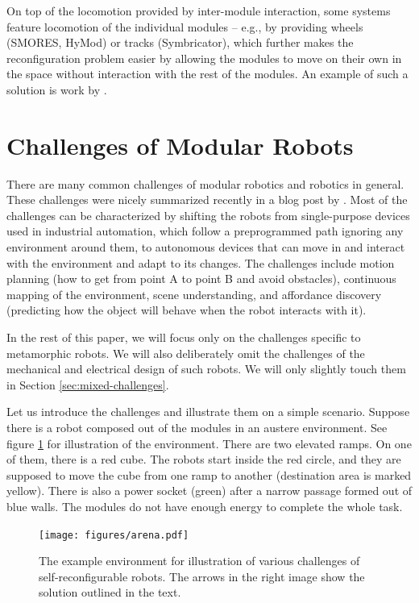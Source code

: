 On top of the locomotion provided by inter-module interaction, some systems
feature locomotion of the individual modules -- e.g., by providing wheels
(SMORES, HyMod) or tracks (Symbricator), which further makes the reconfiguration
problem easier by allowing the modules to move on their own in the space without
interaction with the rest of the modules. An example of such a solution is
work by \textcite{DBLP:journals/ral/LiuWY19}.

\section{Challenges of Modular Robots}

There are many common challenges of modular robotics and robotics in general.
These challenges were nicely summarized recently in a blog post by
\textcite{locklin_2020}. Most of the challenges can be characterized by shifting
the robots from single-purpose devices used in industrial automation, which
follow a preprogrammed path ignoring any environment around them, to autonomous
devices that can move in and interact with the environment and adapt to its
changes. The challenges include motion planning (how to get from
point A to point B and avoid obstacles), continuous mapping of the environment,
scene understanding, and affordance discovery (predicting how the object will
behave when the robot interacts with it).

In the rest of this paper, we will focus only on the challenges specific to
metamorphic robots. We will also deliberately omit the challenges of the
mechanical and electrical design of such robots. We will only slightly touch
them in Section \ref{sec:mixed-challenges}.

Let us introduce the challenges and illustrate them on a simple scenario.
Suppose there is a robot composed out of the modules in an austere environment.
See figure \ref{fig:arena} for illustration of the environment. There are two
elevated ramps. On one of them, there is a red cube. The robots start inside the
red circle, and they are supposed to move the cube from one ramp to another
(destination area is marked yellow). There is also a power socket (green) after
a narrow passage formed out of blue walls. The modules do not have enough energy
to complete the whole task.

\begin{figure}[!t]
    \centering
    \texttt{[image: figures/arena.pdf]}
    \caption{The example environment for illustration of various challenges of
    self-reconfigurable robots. The arrows in the right image show the
    solution outlined in the text.}
    \label{fig:arena}
\end{figure}

